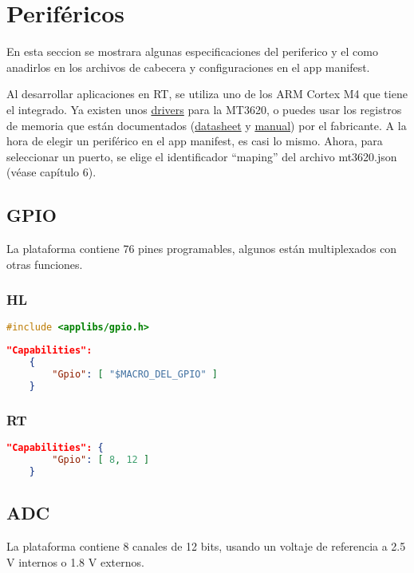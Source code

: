 \section{Periféricos}
En esta seccion se mostrara algunas especificaciones del periferico y el como anadirlos en los archivos de cabecera y configuraciones en el app manifest.\par
Al desarrollar aplicaciones en RT, se utiliza uno de los ARM Cortex M4 que tiene el integrado. Ya existen unos \href{https://github.com/CodethinkLabs/mt3620-m4-drivers/tree/master}{drivers} para la MT3620, o puedes usar los registros de memoria que están documentados (\href{https://d86o2zu8ugzlg.cloudfront.net/mediatek-craft/documents/mt3620/MT3620-Datasheet-v1.7.pdf}{datasheet} y
\href{https://d86o2zu8ugzlg.cloudfront.net/mediatek-craft/documents/MT3620-M4-User-Manual.pdf}{manual}) por el fabricante. A la hora de elegir un periférico en el app manifest, es casi lo mismo. Ahora, para seleccionar un puerto, se elige el identificador ``maping'' del archivo mt3620.json (véase capítulo 6).


\subsection{GPIO}
La plataforma contiene 76 pines programables, algunos están multiplexados con otras funciones.
\subsubsection{HL}

\begin{lstlisting}[language = C, firstnumber=0]
	#include <applibs/gpio.h>
\end{lstlisting}
\begin{lstlisting}[language = json, firstnumber=0]	
	"Capabilities": 
	{  
		"Gpio": [ "$MACRO_DEL_GPIO" ] 
	}
\end{lstlisting}
\subsubsection{RT}
\begin{lstlisting}[language = json, firstnumber=0]	
	"Capabilities": {
		"Gpio": [ 8, 12 ]
	}
\end{lstlisting}

\subsection{ADC}
La plataforma contiene 8 canales de 12 bits, usando un voltaje de referencia a 2.5 V internos o 1.8 V externos.
